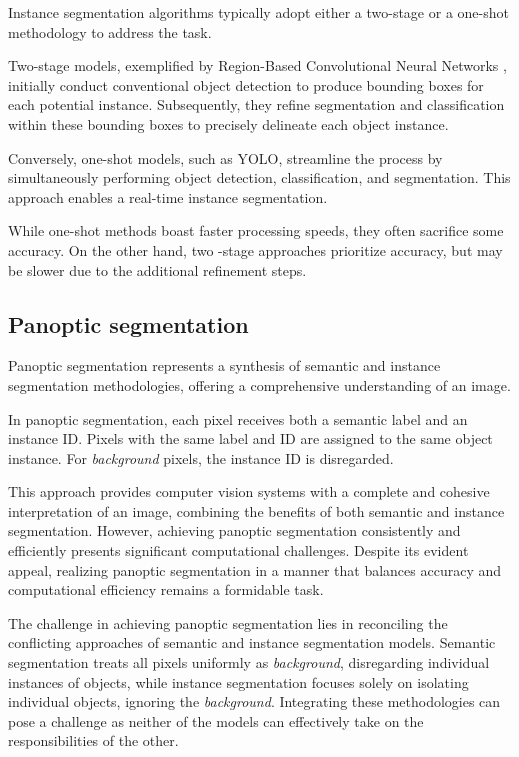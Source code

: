 Instance segmentation algorithms typically adopt either a two-stage or a one-shot methodology to address the task.

Two-stage models, exemplified by Region-Based Convolutional Neural Networks \cite{RCNN2014}, initially conduct
conventional object detection to produce bounding boxes for each potential instance. Subsequently, they refine segmentation and classification within these bounding boxes to precisely delineate each object instance.

Conversely, one-shot models, such as YOLO, streamline the process by simultaneously performing object detection,
classification, and segmentation. This approach enables a real-time instance segmentation.

While one-shot methods boast faster processing speeds, they often sacrifice some accuracy. On the other hand, two
-stage approaches prioritize accuracy, but may be slower due to the additional refinement steps.

  \subsection{Panoptic segmentation}
Panoptic segmentation represents a synthesis of semantic and instance segmentation methodologies, offering a comprehensive understanding of an image.

In panoptic segmentation, each pixel receives both a semantic label and an instance ID. Pixels with the same label and ID are assigned to the same object instance. For \textit{background} pixels, the instance ID is disregarded.

This approach provides computer vision systems with a complete and cohesive interpretation of an image, combining the benefits of both semantic and instance segmentation. However, achieving panoptic segmentation consistently and efficiently presents significant computational challenges. Despite its evident appeal, realizing panoptic segmentation in a manner that balances accuracy and computational efficiency remains \linebreak a formidable task.

The challenge in achieving panoptic segmentation lies in reconciling the conflicting approaches of semantic and
instance segmentation models. Semantic segmentation treats all pixels uniformly as \textit{background}, disregarding
individual instances of objects, while instance segmentation focuses solely on isolating individual objects, ignoring
the \textit{background}. Integrating these methodologies can pose a challenge as neither of the models can effectively
take on the responsibilities of the other.

